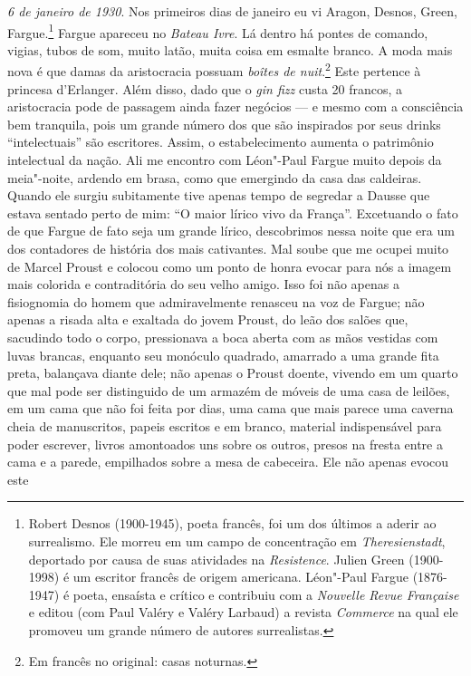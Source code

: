 \emph{6 de janeiro de 1930}. Nos primeiros dias de janeiro eu vi Aragon,
Desnos, Green, Fargue.\footnote{Robert Desnos (1900-1945), poeta
  francês, foi um dos últimos a aderir ao surrealismo. Ele morreu em um
  campo de concentração em \emph{Theresienstadt}, deportado por causa de
  suas atividades na \emph{Resistence}. Julien Green (1900-1998) é um
  escritor francês de origem americana. Léon"-Paul Fargue (1876-1947) é
  poeta, ensaísta e crítico e contribuiu com a \emph{Nouvelle Revue
  Française} e editou (com Paul Valéry e Valéry Larbaud) a revista
  \emph{Commerce} na qual ele promoveu um grande número de autores
  surrealistas. \versal{[N. E.]}} Fargue apareceu no \emph{Bateau Ivre}. Lá dentro há
pontes de comando, vigias, tubos de som, muito latão, muita coisa em
esmalte branco. A moda mais nova é que damas da aristocracia possuam
\emph{boîtes de nuit}.\footnote{Em francês no original: casas noturnas. \versal{[N. T.]}} Este pertence à princesa d'Erlanger. Além disso, dado que
o \emph{gin fizz} custa 20 francos, a aristocracia pode de passagem
ainda fazer negócios --- e mesmo com a consciência bem tranquila, pois um
grande número dos que são inspirados por seus drinks ``intelectuais'' são escritores.
Assim, o estabelecimento aumenta o patrimônio intelectual da nação. Ali me
encontro com Léon"-Paul Fargue muito depois da meia"-noite, ardendo em
brasa, como que emergindo da casa das caldeiras. Quando ele surgiu
subitamente tive apenas tempo de segredar a Dausse que estava sentado
perto de mim: ``O maior lírico vivo da França''. Excetuando o fato de
que Fargue de fato seja um grande lírico, descobrimos nessa noite que
era um dos contadores de história dos mais cativantes. Mal soube que me
ocupei muito de Marcel Proust e colocou como um ponto de honra evocar
para nós a imagem mais colorida e contraditória do seu velho amigo. Isso
foi não apenas a fisiognomia do homem que admiravelmente renasceu na voz
de Fargue; não apenas a risada alta e exaltada do jovem Proust, do leão
dos salões que, sacudindo todo o corpo, pressionava a boca aberta com as
mãos vestidas com luvas brancas, enquanto seu monóculo quadrado,
amarrado a uma grande fita preta, balançava diante dele; não apenas o
Proust doente, vivendo em um quarto que mal pode ser distinguido de um
armazém de móveis de uma casa de leilões, em um cama que não foi feita
por dias, uma cama que mais parece uma caverna cheia de manuscritos,
papeis escritos e em branco, material indispensável para poder escrever,
livros amontoados uns sobre os outros, presos na fresta entre a cama e a
parede, empilhados sobre a mesa de cabeceira. Ele não apenas evocou este
